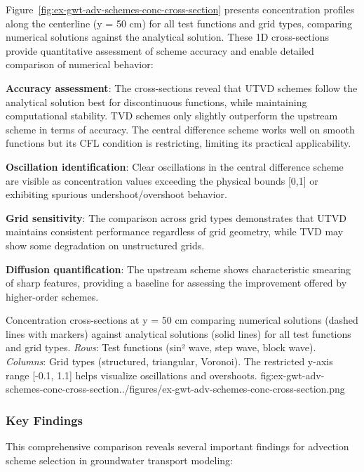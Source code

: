 Figure~\ref{fig:ex-gwt-adv-schemes-conc-cross-section} presents concentration profiles along the centerline (y = 50 cm) for all test functions and grid types, comparing numerical solutions against the analytical solution. These 1D cross-sections provide quantitative assessment of scheme accuracy and enable detailed comparison of numerical behavior:

\textbf{Accuracy assessment}: The cross-sections reveal that UTVD schemes follow the analytical solution best for discontinuous functions, while maintaining computational stability. TVD schemes only slightly outperform the upstream scheme in terms of accuracy. The central difference scheme works well on smooth functions but its CFL condition is restricting, limiting its practical applicability.

\textbf{Oscillation identification}: Clear oscillations in the central difference scheme are visible as concentration values exceeding the physical bounds [0,1] or exhibiting spurious undershoot/overshoot behavior.

\textbf{Grid sensitivity}: The comparison across grid types demonstrates that UTVD maintains consistent performance regardless of grid geometry, while TVD may show some degradation on unstructured grids.

\textbf{Diffusion quantification}: The upstream scheme shows characteristic smearing of sharp features, providing a baseline for assessing the improvement offered by higher-order schemes.

\begin{StandardFigure}{
    Concentration cross-sections at y = 50 cm comparing numerical solutions (dashed lines with markers) against analytical solutions (solid lines) for all test functions and grid types. \textit{Rows}: Test functions (sin² wave, step wave, block wave). \textit{Columns}: Grid types (structured, triangular, Voronoi). The restricted y-axis range [-0.1, 1.1] helps visualize oscillations and overshoots.
}{fig:ex-gwt-adv-schemes-conc-cross-section}{../figures/ex-gwt-adv-schemes-conc-cross-section.png}
\end{StandardFigure}

\subsubsection{Key Findings}

This comprehensive comparison reveals several important findings for advection scheme selection in groundwater transport modeling:


